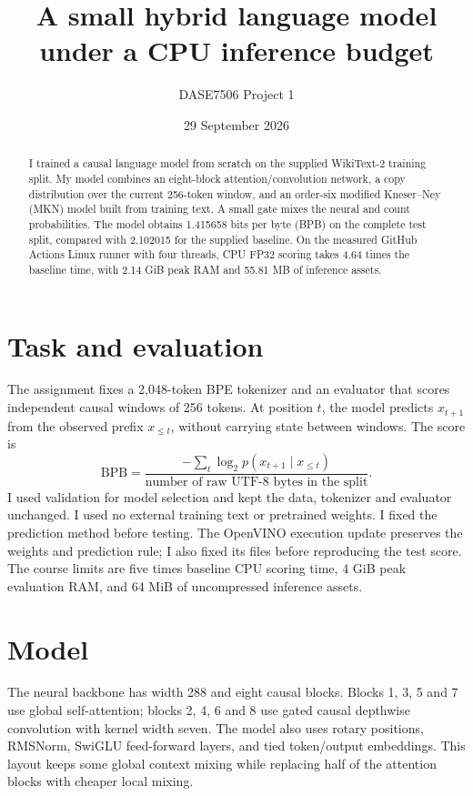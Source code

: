 \documentclass[11pt,a4paper]{article}
\title{A small hybrid language model under a CPU inference budget}
\author{DASE7506 Project 1}
\date{29 September 2026}
\begin{document}
\maketitle

\begin{abstract}
I trained a causal language model from scratch on the supplied WikiText-2 training split. My model combines an eight-block attention/convolution network, a copy distribution over the current 256-token window, and an order-six modified Kneser--Ney (MKN) model built from training text. A small gate mixes the neural and count probabilities. The model obtains 1.415658 bits per byte (BPB) on the complete test split, compared with 2.102015 for the supplied baseline. On the measured GitHub Actions Linux runner with four threads, CPU FP32 scoring takes 4.64 times the baseline time, with 2.14 GiB peak RAM and 55.81 MB of inference assets.
\end{abstract}

\section{Task and evaluation}

The assignment fixes a 2,048-token BPE tokenizer and an evaluator that scores independent causal windows of 256 tokens. At position $t$, the model predicts $x_{t+1}$ from the observed prefix $x_{\leq t}$, without carrying state between windows. The score is
\[
\mathrm{BPB}=\frac{-\sum_t \log_2 p(x_{t+1}\mid x_{\leq t})}{\text{number of raw UTF-8 bytes in the split}}.
\]
I used validation for model selection and kept the data, tokenizer and evaluator unchanged. I used no external training text or pretrained weights. I fixed the prediction method before testing. The OpenVINO execution update preserves the weights and prediction rule; I also fixed its files before reproducing the test score. The course limits are five times baseline CPU scoring time, 4 GiB peak evaluation RAM, and 64 MiB of uncompressed inference assets.

\section{Model}

The neural backbone has width 288 and eight causal blocks. Blocks 1, 3, 5 and 7 use global self-attention; blocks 2, 4, 6 and 8 use gated causal depthwise convolution with kernel width seven. The model also uses rotary positions, RMSNorm, SwiGLU feed-forward layers, and tied token/output embeddings. This layout keeps some global context mixing while replacing half of the attention blocks with cheaper local mixing.
\end{document}
